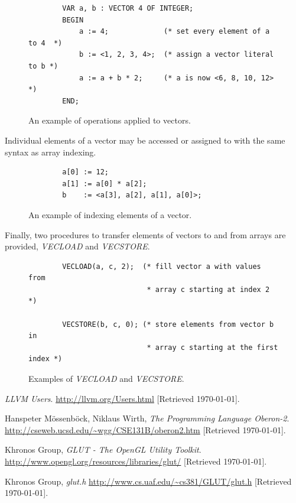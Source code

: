 \documentclass[a4paper,11pt]{article}
\begin{document}
    \begin{figure}[!htbp]
    \begin{lstlisting}
        VAR a, b : VECTOR 4 OF INTEGER;
        BEGIN
            a := 4;             (* set every element of a to 4  *)
            b := <1, 2, 3, 4>;  (* assign a vector literal to b *)
            a := a + b * 2;     (* a is now <6, 8, 10, 12>      *)
        END;
    \end{lstlisting}
    \caption{An example of operations applied to vectors.}
    \end{figure}

    \noindent
    Individual elements of a vector may be accessed or assigned to with the same syntax as array indexing.

    \begin{figure}[!htbp]
    \begin{lstlisting}
        a[0] := 12;
        a[1] := a[0] * a[2];
        b    := <a[3], a[2], a[1], a[0]>;
    \end{lstlisting}
    \caption{An example of indexing elements of a vector.}
    \end{figure}

    \noindent
    Finally, two procedures to transfer elements of vectors to and from arrays are provided, \emph{VECLOAD} and \emph{VECSTORE}.

    \begin{figure}[!htbp]
    \begin{lstlisting}
        VECLOAD(a, c, 2);  (* fill vector a with values from
                            * array c starting at index 2    *)

        VECSTORE(b, c, 0); (* store elements from vector b in
                            * array c starting at the first index *)
    \end{lstlisting}
    \caption{Examples of \emph{VECLOAD} and \emph{VECSTORE}.}
    \end{figure}

    \begin{thebibliography}{9}
            \emph{LLVM Users}. \newline
            \url{http://llvm.org/Users.html}
            [Retrieved \today].

            Hanspeter M\"{o}ssenb\"{o}ck, Niklaus Wirth,
            \emph{The Programming Language Oberon-2}. \newline
            \url{http://cseweb.ucsd.edu/~wgg/CSE131B/oberon2.htm}
            [Retrieved \today].

            Khronos Group,
            \emph{GLUT - The OpenGL Utility Toolkit}. \newline
            \url{http://www.opengl.org/resources/libraries/glut/}
            [Retrieved \today].

            Khronos Group,
            \emph{glut.h} \newline
            \url{http://www.cs.uaf.edu/~cs381/GLUT/glut.h}
            [Retrieved \today].

    \end{thebibliography}
\end{document}
